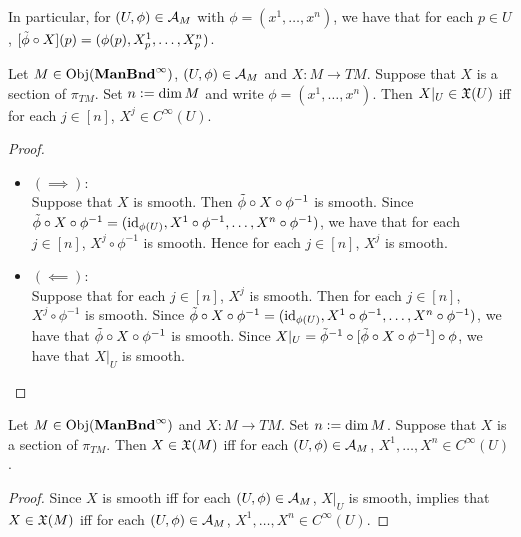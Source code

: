 \documentclass{book}
\begin{document}
\begin{note}
	In particular, for $(U, \phi) \in \mathcal{A}_M$ with $\phi = (x^1, \ldots, x^n)$, we have that for each $p \in U$, $[\tilde{\phi} \circ X](p) = (\phi(p), X^1_p, \ldots, X^n_p)$.   
\end{note}

\begin{ex}
	Let $M \in \operatorname{Obj}(\operatorname*{\text{\textbf{ManBnd}}^{\infty}})$, $(U, \phi) \in \mathcal{A}_M$ and $X: M \rightarrow TM$. Suppose that $X$ is a section of $\pi_{TM}$. Set $n \vcentcolon= \dim M$ and write $\phi = (x^1, \ldots, x^n)$. Then $X|_U \in \mathfrak{X}(U)$ iff for each $j \in [n]$, $X^j \in C^{\infty}(U)$.
\end{ex}

\begin{proof} \
	\begin{itemize}
		\item $(\implies)$: \\
		Suppose that $X$ is smooth. Then $\tilde{\phi} \circ X \circ \phi^{-1}$ is smooth. Since $\tilde{\phi} \circ X \circ \phi^{-1} = (\operatorname{id}_{\phi(U)}, X^1 \circ \phi^{-1}, \ldots, X^n \circ \phi^{-1})$, we have that for each $j \in [n]$, $X^j \circ \phi^{-1}$ is smooth. Hence for each $j \in [n]$, $X^j$ is smooth. 
		\item $(\impliedby)$: \\
		Suppose that for each $j \in [n]$, $X^j$ is smooth. Then for each $j \in [n]$, $X^j \circ \phi^{-1}$ is smooth. Since $\tilde{\phi} \circ X \circ \phi^{-1} = (\operatorname{id}_{\phi(U)}, X^1 \circ \phi^{-1}, \ldots, X^n \circ \phi^{-1})$, we have that $\tilde{\phi} \circ X \circ \phi^{-1}$ is smooth. Since $X|_U = \tilde{\phi}^{-1} \circ [\tilde{\phi} \circ X \circ \phi^{-1}] \circ \phi$, we have that $X|_U$ is smooth.
	\end{itemize}
\end{proof}

\begin{ex}
	Let $M \in \operatorname{Obj}(\operatorname*{\text{\textbf{ManBnd}}^{\infty}})$ and $X: M \rightarrow TM$. Set $n \vcentcolon= \dim M$. Suppose that $X$ is a section of $\pi_{TM}$. Then $X \in \mathfrak{X}(M)$ iff for each $(U, \phi) \in \mathcal{A}_M$, $X^1, \ldots, X^n \in C^{\infty}(U)$.
\end{ex}

\begin{proof}
	Since $X$ is smooth iff for each $(U, \phi) \in \mathcal{A}_M$, $X|_U$ is smooth,  implies that $X \in \mathfrak{X}(M)$ iff for each $(U, \phi) \in \mathcal{A}_M$, $X^1, \ldots, X^n \in C^{\infty}(U)$. 
\end{proof}
\end{document}
